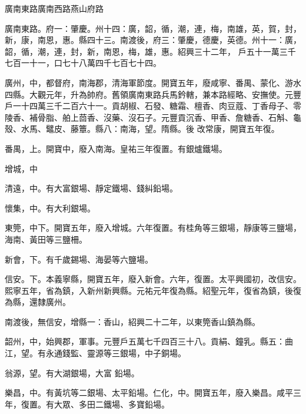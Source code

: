 
\begin{pinyinscope}

 廣南東路廣南西路燕山府路



 廣南東路。府一：肇慶。州十四：廣，韶，循，潮，連，梅，南雄，英，賀，封，新，康，南恩，惠。縣四十三。南渡後，府三：肇慶，德慶，英德。州十一：廣，韶，循，潮，連，封，新，南恩，梅，雄，惠。紹興三十二年，
 戶五十一萬三千七百一十一，口七十八萬四千七百七十四。



 廣州，中，都督府，南海郡，清海軍節度。開寶五年，廢咸寧、番禺、蒙化、游水四縣。大觀元年，升為帥府。舊領廣南東路兵馬鈐轄，兼本路經略、安撫使。元豐戶一十四萬三千二百六十一。貢胡椒、石發、糖霜、檀香、肉豆蔻、丁香母子、零陵香、補骨脂、舶上茴香、沒藥、沒石子。元豐貢沉香、甲香、詹糖香、石斛、龜殼、水馬、鼊皮、藤簟。縣八：南海，望。隋縣。後
 改常康，開寶五年復。



 番禺，上。開寶中，廢入南海。皇祐三年復置。有銀爐鐵場。



 增城，中



 清遠，中。有大富銀場、靜定鐵場、錢糾鉛場。



 懷集，中。有大利銀場。



 東筦，中下。開寶五年，廢入增城。六年復置。有桂角等三銀場，靜康等三鹽場，海南、黃田等三鹽柵。



 新會，下。有千歲錫場、海晏等六鹽場。



 信安。下。本義寧縣，開寶五年，廢入新會。六年，復置。太平興國初，改信安。熙寧五年，省為鎮，入新州新興縣。元祐元年復為縣。紹聖元年，復省為鎮，後復為縣，還隸廣州。



 南渡後，無信安，增縣一：香山，紹興二十二年，以東筦香山鎮為縣。



 韶州，中，始興郡，軍事。元豐戶五萬七千四百三十八。貢絹、鐘乳。縣五：曲江，望。有永通錢監、靈源等三銀場，中子銅場。



 翁源，望。有大湖銀場，大富
 鉛場。



 樂昌，中。有黃坑等二銀場、太平鉛場。仁化，中。開寶五年，廢入樂昌。咸平三年，復置。有大眾、多田二鐵場、多寶鉛場。




\end{pinyinscope}
